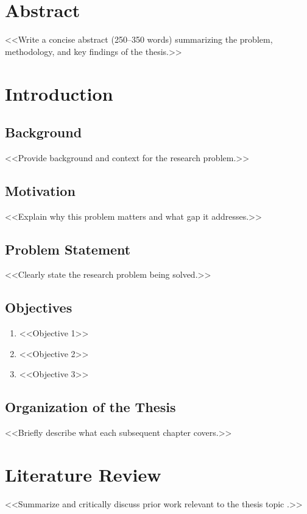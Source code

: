 \documentclass[12pt,a4paper]{report}
\begin{document}
\chapter*{Abstract}
<<Write a concise abstract (250--350 words) summarizing the problem, methodology, and key findings of the thesis.>>

\tableofcontents
\listoffigures
\listoftables

\clearpage
{}

\chapter{Introduction}
\label{ch:intro}

\section{Background}
<<Provide background and context for the research problem.>>

\section{Motivation}
<<Explain why this problem matters and what gap it addresses.>>

\section{Problem Statement}
<<Clearly state the research problem being solved.>>

\section{Objectives}
\begin{enumerate}
    \item <<Objective 1>>
    \item <<Objective 2>>
    \item <<Objective 3>>
\end{enumerate}

\section{Organization of the Thesis}
<<Briefly describe what each subsequent chapter covers.>>

\chapter{Literature Review}
\label{ch:litreview}
<<Summarize and critically discuss prior work relevant to the thesis topic \citep{example2000}.>>
\end{document}
